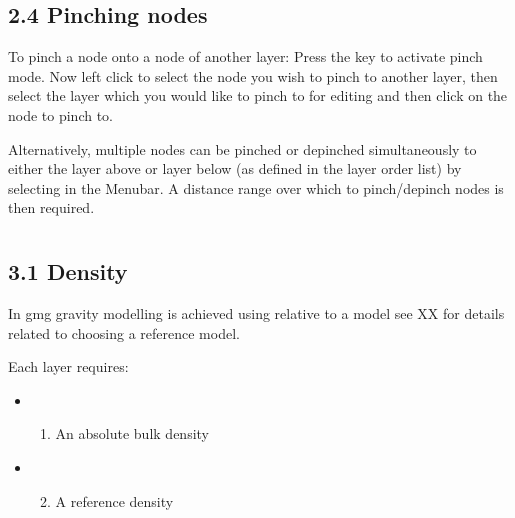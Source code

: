 \documentclass[a4paper,12pt,english]{sphinxmanual}
\begin{document}
\begin{DUlineblock}{0em}
\item[] 
\end{DUlineblock}


\subsection{2.4 Pinching nodes}
\label{\detokenize{manual__layer_nodes:pinching-nodes}}
To pinch a node onto a node of another layer: Press the  key to activate pinch mode.
Now left click to select the node you wish to pinch to another layer, then select the layer which you would like to pinch
to for editing and then click on the node to pinch to.

Alternatively, multiple nodes can be pinched or depinched simultaneously to either the layer above or layer below
(as defined in the layer order list) by selecting  in the Menubar.
A distance range over which to pinch/depinch nodes is then required.


\section{}
\label{\detokenize{manual__layer_attributes:layer-attributes}}\label{\detokenize{manual__layer_attributes::doc}}
\begin{DUlineblock}{0em}
\item[] 
\end{DUlineblock}


\subsection{3.1 Density}
\label{\detokenize{manual__layer_attributes:density}}
In gmg gravity modelling is achieved using  relative to a  model
see XX for details related to choosing a reference model.

Each layer requires:
\begin{itemize}
\item {} \begin{enumerate}
\item {} 
An absolute bulk density

\end{enumerate}

\item {} \begin{enumerate}
\setcounter{enumi}{1}
\item {} 
A reference density

\end{enumerate}

\end{itemize}
\end{document}

